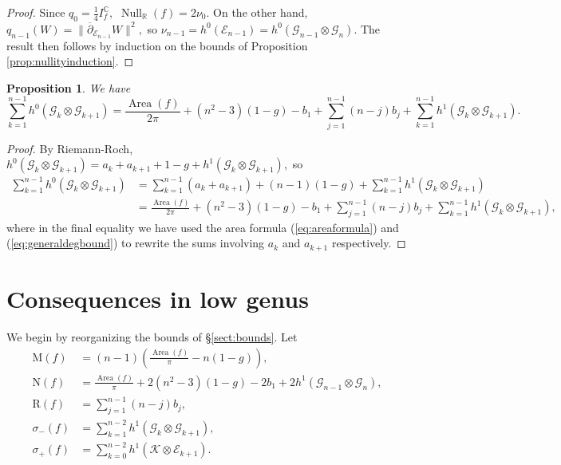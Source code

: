 \documentclass[11pt]{article}
\newtheorem{prop}[theorem]{Proposition}
\theoremstyle{definition}
\newcommand{\R}{\mathbb{R}}
\newcommand{\C}{\mathbb{C}}
\newcommand{\delbar}{\overline{\partial}}
\numberwithin{equation}{section}
\begin{document}
\begin{proof}
    Since $q_0 = \tfrac{1}{4} I^\C_f,$ $\operatorname{Null}_\R(f) = 2 \nu_0.$ On the other hand, $q_{n-1}(W) = \lVert \delbar_{\mathcal{E}_{n-1}} W \rVert^2,$ so $\nu_{n-1} = h^0(\mathcal{E}_{n-1}) = h^0(\mathcal{G}_{n-1} \otimes \mathcal{G}_n).$ The result then follows by induction on the bounds of Proposition \ref{prop:nullityinduction}.
\end{proof}

\begin{prop}\label{prop:sumh0gkgk1}
    We have
    \begin{equation*}
        \sum_{k=1}^{n-1} h^0(\mathcal{G}_k \otimes \mathcal{G}_{k+1}) = \frac{\operatorname{Area}(f)}{2\pi} + (n^2-3)(1-g)-b_1 + \sum_{j=1}^{n-1} (n-j)b_j + \sum_{k=1}^{n-1} h^1(\mathcal{G}_k \otimes \mathcal{G}_{k+1}).
    \end{equation*}
\end{prop}

\begin{proof}
    By Riemann-Roch, $h^0(\mathcal{G}_k \otimes \mathcal{G}_{k+1}) = a_k + a_{k+1} + 1 - g + h^1(\mathcal{G}_k \otimes \mathcal{G}_{k+1}),$ so
    \begin{equation*}
        \begin{aligned}
            \sum_{k=1}^{n-1} h^0(\mathcal{G}_k \otimes \mathcal{G}_{k+1}) &= \sum_{k=1}^{n-1} (a_k + a_{k+1}) + (n-1)(1-g) + \sum_{k=1}^{n-1} h^1(\mathcal{G}_k \otimes \mathcal{G}_{k+1}) \\
            &= \frac{\operatorname{Area}(f)}{2\pi} + (n^2-3)(1-g)-b_1 + \sum_{j=1}^{n-1} (n-j)b_j + \sum_{k=1}^{n-1} h^1(\mathcal{G}_k \otimes \mathcal{G}_{k+1}),
        \end{aligned}
    \end{equation*}
    where in the final equality we have used the area formula (\ref{eq:areaformula}) and (\ref{eq:generaldegbound}) to rewrite the sums involving $a_k$ and $a_{k+1}$ respectively.
\end{proof}

\section{Consequences in low genus}\label{sect:lowgenus}

\indent \indent We begin by reorganizing the bounds of \S\ref{sect:bounds}. Let
\begin{equation}
\begin{aligned}
    \mathrm{M}(f) &= (n-1)\left(\frac{\operatorname{Area}(f)}{\pi} - n(1-g) \right), \\
    \mathrm{N}(f) &= \frac{\operatorname{Area}(f)}{\pi} + 2(n^2-3)(1-g) -2b_1 + 2 h^1(\mathcal{G}_{n-1} \otimes \mathcal{G}_n),\\
    \mathrm{R}(f) &= \sum_{j=1}^{n-1} (n-j)b_j, \\
    \sigma_-(f) &= \sum_{k=1}^{n-2} h^1(\mathcal{G}_k \otimes \mathcal{G}_{k+1}), \\
    \sigma_+(f) &= \sum_{k=0}^{n-2} h^1(\mathcal{K} \otimes \mathcal{E}_{k+1}).
\end{aligned}
\end{equation}
\end{document}
